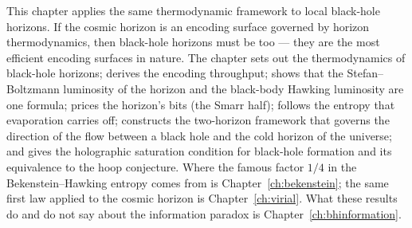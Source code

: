 This chapter applies the same thermodynamic framework to local black-hole horizons. If the cosmic horizon is an encoding surface governed by horizon
thermodynamics, then black-hole horizons must be too --- they are the most efficient encoding surfaces in nature. The chapter sets out the thermodynamics
of black-hole horizons; derives the encoding throughput; shows that the Stefan--Boltzmann luminosity of the horizon and the black-body Hawking luminosity
are one formula; prices the horizon's bits (the Smarr half); follows the entropy that evaporation carries off; constructs the two-horizon framework that
governs the direction of the flow between a black hole and the cold horizon of the universe; and gives the holographic saturation condition for black-hole
formation and its equivalence to the hoop conjecture. Where the famous factor $1/4$ in the Bekenstein--Hawking entropy comes from is
Chapter~\ref{ch:bekenstein}; the same first law applied to the cosmic horizon is Chapter~\ref{ch:virial}. What these results do and do not say about the
information paradox is Chapter~\ref{ch:bhinformation}.

